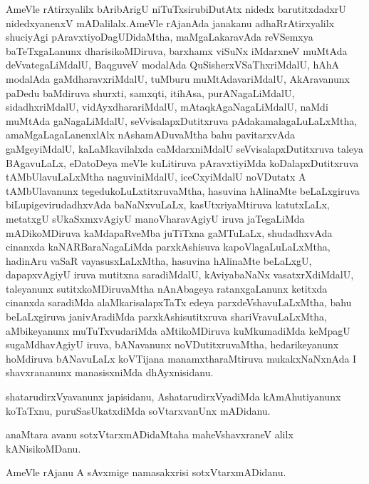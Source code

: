 \documentclass{article}
\begin{document}
\begin{mn}
AmeVle  rAtirxyalilx  bAribArigU  niTuTxsirubiDutAtx  nidedx  barutitxdadxrU  nidedxyanenxV  mADalilalx.AmeVle  rAjanAda  janakanu  
adhaRrAtirxyalilx  shuciyAgi  pAravxtiyoDagUDidaMtha,  maMgaLakaravAda  reVSemxya  baTeTxgaLanunx  dharisikoMDiruva,  barxhamx  viSuNx  
iMdarxneV  muMtAda  deVvategaLiMdalU,  BaqguveV  modalAda  QuSisherxVSaThxriMdalU,  hAhA  modalAda  gaMdharavxriMdalU,  tuMburu  
muMtAdavariMdalU,  AkAravanunx  paDedu  baMdiruva  shurxti,  samxqti,  itihAsa,  purANagaLiMdalU,  sidadhxriMdalU,  vidAyxdharariMdalU,  
mAtaqkAgaNagaLiMdalU,  naMdi  muMtAda  gaNagaLiMdalU,  seVvisalapxDutitxruva  pAdakamalagaLuLaLxMtha,  amaMgaLagaLanenxlAlx  nAshamADuvaMtha  
bahu  pavitarxvAda  gaMgeyiMdalU,  kaLaMkavilalxda  caMdarxniMdalU  seVvisalapxDutitxruva  taleya   BAgavuLaLx,  eDatoDeya  meVle  kuLitiruva  
pAravxtiyiMda  koDalapxDutitxruva  tAMbUlavuLaLxMtha  naguviniMdalU,  iceCxyiMdalU  noVDutatx  A  tAMbUlavanunx  tegedukoLuLxtitxruvaMtha,  
hasuvina  hAlinaMte  beLaLxgiruva  biLupigevirudadhxvAda  baNaNxvuLaLx,  kasUtxriyaMtiruva  katutxLaLx,  metatxgU  sUkaSxmxvAgiyU  manoVharavAgiyU  
iruva  jaTegaLiMda  mADikoMDiruva  kaMdapaRveMba  juTiTxna  gaMTuLaLx,  shudadhxvAda  cinanxda  kaNARBaraNagaLiMda  parxkAshisuva  kapoVlagaLuLaLxMtha,  
hadinAru  vaSaR  vayasusxLaLxMtha,  hasuvina  hAlinaMte  beLaLxgU,  dapapxvAgiyU  iruva  mutitxna  saradiMdalU,  kAviyabaNaNx  vasatxrXdiMdalU,  
taleyanunx  sutitxkoMDiruvaMtha  nAnAbageya  ratanxgaLanunx  ketitxda  cinanxda  saradiMda  alaMkarisalapxTaTx  edeya  parxdeVshavuLaLxMtha,  bahu  
beLaLxgiruva  janivAradiMda  parxkAshisutitxruva  shariVravuLaLxMtha,  aMbikeyanunx  muTuTxvudariMda  aMtikoMDiruva  kuMkumadiMda  keMpagU  
sugaMdhavAgiyU  iruva,  bANavanunx  noVDutitxruvaMtha,  hedarikeyanunx  hoMdiruva  bANavuLaLx  koVTijana  manamxtharaMtiruva  mukakxNaNxnAda  I
shavxrananunx  manasisxniMda  dhAyxnisidanu.
\end{mn}

\begin{mn}
shatarudirxVyavanunx  japisidanu,  AshatarudirxVyadiMda  kAmAhutiyanunx  koTaTxnu,  puruSasUkatxdiMda  soVtarxvanUnx  mADidanu. 
\end{mn}

\begin{mn}
anaMtara  avanu  sotxVtarxmADidaMtaha  maheVshavxraneV  alilx  kANisikoMDanu.
\end{mn}

\begin{mn}
AmeVle  rAjanu  A  sAvxmige  namasakxrisi  sotxVtarxmADidanu.
\end{mn}
\end{document}
